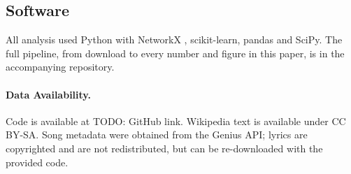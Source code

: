 \documentclass[9pt,twocolumn,twoside]{pnas-new}
\newcommand{\Verify}[1]{{\color{orange}#1}}
\providecommand{\dataavail}[1]{\paragraph*{Data Availability.} #1}
\providecommand{\bibsplit}[1][]{}
\begin{document}
{\subsection*{Software}
All analysis used Python with NetworkX \cite{hagberg2008}, scikit-learn, pandas and SciPy. The full pipeline, from download to every number and figure in this paper, is in the accompanying repository.
}

\showmatmethods{} %

\dataavail{Code is available at \Verify{TODO: GitHub link}. Wikipedia text is available under CC BY-SA. Song metadata were obtained from the Genius API; lyrics are copyrighted and are not redistributed, but can be re-downloaded with the provided code.}


\showacknow{} %

\bibsplit[3]


\end{document}
